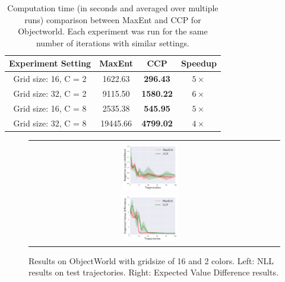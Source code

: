\documentclass{article}
\def\MSHangBox#1{%
\begin{minipage}[t]{\textwidth}%
\begin{tabbing} %
~\\[-\baselineskip] %
#1 %
\end{tabbing}%
\end{minipage}} %
\begin{document}
\begin{table}[t]
\centering
\def\arraystretch{1.4}%
\begin{tabular}{|c|c|c|c|}
\hline
Experiment Setting & MaxEnt & CCP & Speedup \\\hline

Grid size: 16, C = 2 & 1622.63 & \textbf{296.43} & $5\times$ \\
Grid size: 32, C = 2 & 9115.50 & \textbf{1580.22} & $6\times$ \\
Grid size: 16, C = 8 & 2535.38  & \textbf{545.95} & $5\times$ \\
Grid size: 32, C = 8 & 19445.66 & \textbf{4799.02} & $4\times$ \\
\hline
\end{tabular}
\caption{Computation time (in seconds and averaged over multiple runs) comparison between MaxEnt and CCP for Objectworld. Each experiment was run for the same number of iterations with similar settings. }
\label{table:table_results_objectworld}
\end{table}

\begin{figure}[t]
\centering
  \begin{tabular}{cc}
    \MSHangBox{\includegraphics[width=0.23\textwidth]{images/objectworld/grid_16_object_8/test_ll.pdf}}
    \MSHangBox{\includegraphics[width=0.23\textwidth]{images/objectworld/grid_16_object_8/evd_maxent_vs_ccp.pdf}}
  \end{tabular}
    \caption{Results on ObjectWorld with gridsize of 16 and 2 colors. Left: NLL results on test trajectories. Right: Expected Value Difference results. }
    \label{fig:img_objectworld_maxent_vs_ccp_lr_01}
\end{figure}
\end{document}
